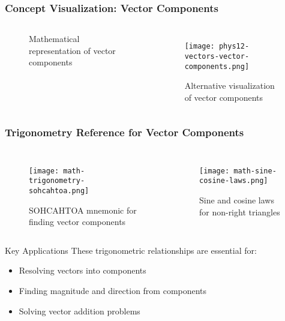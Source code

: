 \documentclass{beamer}
\begin{document}
\begin{frame}
\frametitle{Concept Visualization: Vector Components}
\begin{columns}
\begin{figure}
\caption{Mathematical representation of vector components}
\end{figure}

\begin{figure}
\centering
\texttt{[image: phys12-vectors-vector-components.png]}
\caption{Alternative visualization of vector components}
\end{figure}
\end{columns}
\end{frame}

\begin{frame}
\frametitle{Trigonometry Reference for Vector Components}
\begin{columns}[T]
    \begin{figure}
        \centering
        \texttt{[image: math-trigonometry-sohcahtoa.png]}
        \caption{SOHCAHTOA mnemonic for finding vector components}
    \end{figure}

    \begin{figure}
        \centering
        \texttt{[image: math-sine-cosine-laws.png]}
        \caption{Sine and cosine laws for non-right triangles}
    \end{figure}
\end{columns}
\begin{block}{Key Applications}
These trigonometric relationships are essential for:
\begin{itemize}
    \item Resolving vectors into components
    \item Finding magnitude and direction from components
    \item Solving vector addition problems
\end{itemize}
\end{block}
\end{frame}
\end{document}
